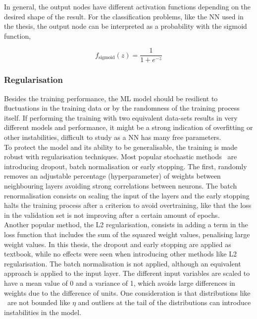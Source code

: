 In general, the output nodes have different activation functions depending on the desired shape of the result. For the classification problems, like the NN used in the thesis, the output node can be interpreted as a probability with the sigmoid function,

\begin{equation}
    f_\text{sigmoid}(z)=\frac{1}{1+e^{-z}}
\end{equation}

\subsubsection{Regularisation}

Besides the training performance, the ML model should be resilient to fluctuations in the training data or by the randomness of the training process itself. If performing the training with two equivalent data-sets results in very different models and performance, it might be a strong indication of overfitting or other instabilities, difficult to study as a NN has many free parameters.\\

To protect the model and its ability to be generalisable, the training is made robust with regularisation techniques. Most popular stochastic methods~\cite{JMLR:v15:srivastava14a,batchnorm,earlystop} are introducing dropout, batch normalisation or early stopping. The first, randomly removes an adjustable percentage (hyperparameter) of weights between neighbouring layers avoiding strong correlations between neurons. The batch renormalisation consists on scaling the input of the layers and the early stopping halts the training process after a criterion to avoid overtraining, like that the loss in the validation set is not improving after a certain amount of epochs.\\

Another popular method, the L2 regularisation, consists in adding a term in the loss function that includes the sum of the squared weight values, penalising large weight values. In this thesis, the dropout and early stopping are applied as textbook, while no effects were seen when introducing other methods like L2 regularisation. The batch normalisation is not applied, although an equivalent approach is applied to the input layer. The different input variables are scaled to have a mean value of 0 and a variance of 1, which avoids large differences in weights due to the difference of units. One consideration is that distributions like \pT\ are not bounded like $\eta$ and outliers at the tail of the distributions can introduce instabilities in the model.

